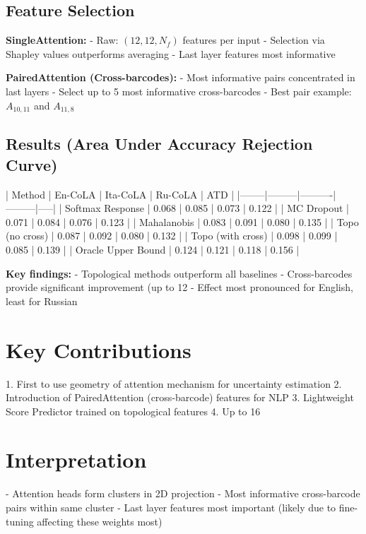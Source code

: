 \subsection{Feature Selection}
\textbf{SingleAttention:}
- Raw: $(12, 12, N_f)$ features per input
- Selection via Shapley values outperforms averaging
- Last layer features most informative

\textbf{PairedAttention (Cross-barcodes):}
- Most informative pairs concentrated in last layers
- Select up to 5 most informative cross-barcodes
- Best pair example: $A_{10,11}$ and $A_{11,8}$

\subsection{Results (Area Under Accuracy Rejection Curve)}

| Method | En-CoLA | Ita-CoLA | Ru-CoLA | ATD |
|--------|---------|----------|---------|-----|
| Softmax Response | 0.068 | 0.085 | 0.073 | 0.122 |
| MC Dropout | 0.071 | 0.084 | 0.076 | 0.123 |
| Mahalanobis | 0.083 | 0.091 | 0.080 | 0.135 |
| Topo (no cross) | 0.087 | 0.092 | 0.080 | 0.132 |
| Topo (with cross) | 0.098 | 0.099 | 0.085 | 0.139 |
| Oracle Upper Bound | 0.124 | 0.121 | 0.118 | 0.156 |

\textbf{Key findings:}
- Topological methods outperform all baselines
- Cross-barcodes provide significant improvement (up to 12%
- Effect most pronounced for English, least for Russian

\section{Key Contributions}
1. First to use geometry of attention mechanism for uncertainty estimation
2. Introduction of PairedAttention (cross-barcode) features for NLP
3. Lightweight Score Predictor trained on topological features
4. Up to 16%

\section{Interpretation}
- Attention heads form clusters in 2D projection
- Most informative cross-barcode pairs within same cluster
- Last layer features most important (likely due to fine-tuning affecting these weights most)
